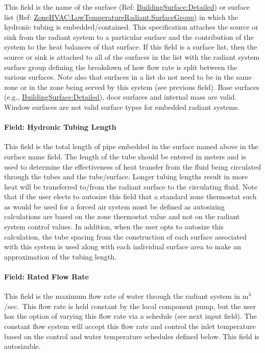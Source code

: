 This field is the name of the surface (Ref: \hyperref[buildingsurfacedetailed]{BuildingSurface:Detailed}) or surface list (Ref: \hyperref[zonehvaclowtemperatureradiantsurfacegroup]{ZoneHVAC:LowTemperatureRadiant:SurfaceGroup}) in which the hydronic tubing is embedded/contained. This specification attaches the source or sink from the radiant system to a particular surface and the contribution of the system to the heat balances of that surface. If this field is a surface list, then the source or sink is attached to all of the surfaces in the list with the radiant system surface group defining the breakdown of how flow rate is split between the various surfaces. Note also that surfaces in a list do not need to be in the same zone or in the zone being served by this system (see previous field). Base surfaces (e.g., \hyperref[buildingsurfacedetailed]{BuildingSurface:Detailed}), door surfaces and internal mass are valid. Window surfaces are not valid surface types for embedded radiant systems.

\paragraph{Field: Hydronic Tubing Length}\label{field-hydronic-tubing-length-001}

This field is the total length of pipe embedded in the surface named above in the surface name field. The length of the tube should be entered in meters and is used to determine the effectiveness of heat transfer from the fluid being circulated through the tubes and the tube/surface. Longer tubing lengths result in more heat will be transferred to/from the radiant surface to the circulating fluid. Note that if the user elects to autosize this field that a standard zone thermostat such as would be used for a forced air system must be defined as autosizing calculations are based on the zone thermostat value and not on the radiant system control values. In addition, when the user opts to autosize this calculation, the tube spacing from the construction of each surface associated with this system is used along with each individual surface area to make an approximation of the tubing length.

\paragraph{Field: Rated Flow Rate}\label{field-rated-flow-rate}

This field is the maximum flow rate of water through the radiant system in m\(^{3}\)/sec.~This flow rate is held constant by the local component pump, but the user has the option of varying this flow rate via a schedule (see next input field). The constant flow system will accept this flow rate and control the inlet temperature based on the control and water temperature schedules defined below. This field is autosizable.

